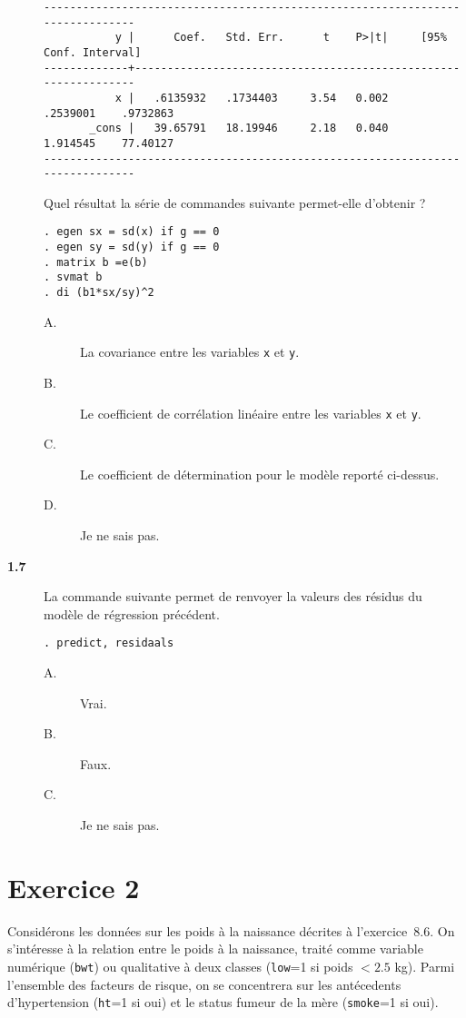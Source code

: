 \begin{description}
\begin{verbatim}
------------------------------------------------------------------------------
           y |      Coef.   Std. Err.      t    P>|t|     [95% Conf. Interval]
-------------+----------------------------------------------------------------
           x |   .6135932   .1734403     3.54   0.002     .2539001    .9732863
       _cons |   39.65791   18.19946     2.18   0.040     1.914545    77.40127
------------------------------------------------------------------------------
\end{verbatim}
Quel résultat la série de commandes suivante permet-elle d'obtenir ?
\begin{verbatim}
. egen sx = sd(x) if g == 0
. egen sy = sd(y) if g == 0
. matrix b =e(b)
. svmat b
. di (b1*sx/sy)^2
\end{verbatim}
\begin{description}
\item[A.] La covariance entre les variables \texttt{x} et \texttt{y}.
\item[B.] Le coefficient de corrélation linéaire entre les variables
  \texttt{x} et \texttt{y}.
\item[C.] Le coefficient de détermination pour le modèle reporté ci-dessus. 
\item[D.] Je ne sais pas.
\end{description}
\item[\bf 1.7] La commande suivante permet de renvoyer la valeurs des
  résidus du modèle de régression précédent. 
\begin{verbatim}
. predict, residaals
\end{verbatim}
\begin{description}
\item[A.] Vrai.
\item[B.] Faux.
\item[C.] Je ne sais pas.
\end{description}
\end{description}

\section*{Exercice 2}
Considérons les données sur les poids à la naissance décrites à
l'exercice~8.6. On s'intéresse à la relation entre le poids à la naissance,
traité comme variable numérique (\texttt{bwt}) ou qualitative à deux classes
(\texttt{low}=1 si poids $<2.5$ kg). Parmi l'ensemble des facteurs de
risque, on se concentrera sur les antécedents d'hypertension (\texttt{ht}=1
si oui) et le status fumeur de la mère (\texttt{smoke}=1 si oui).

